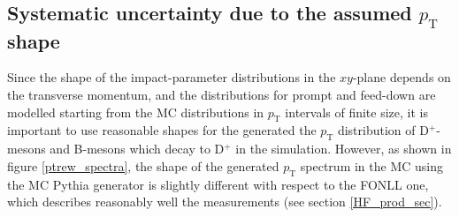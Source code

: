 \documentclass[b5paper,10pt,twoside,oldstyle,classica]{toptesi}
\newcommand{\pt}{p_\text{T}}
\begin{document}
\subsection{Systematic uncertainty due to the assumed $\pt$ shape}
\label{IP_syst_ptshape}
Since the shape of the impact-parameter distributions in the $xy$-plane depends on the transverse momentum, and the distributions for prompt and feed-down are modelled starting from the MC distributions in $\pt$ intervals of finite size, it is important to use reasonable shapes for the generated the $\pt$ distribution of D$^+$-mesons and B-mesons which decay to D$^+$ in the simulation. However, as shown in figure \ref{ptrew_spectra}, the shape of the generated $\pt$ spectrum in the MC using the MC Pythia generator is slightly different with respect to the FONLL one, which describes reasonably well the measurements (see section \ref{HF_prod_sec}). 
\end{document}
